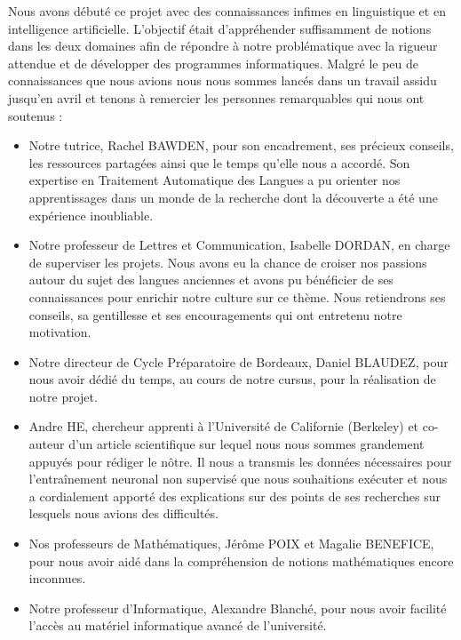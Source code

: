 \documentclass[12pt, twoside]{report}
\begin{document}
Nous avons débuté ce projet avec des connaissances infimes en linguistique et en intelligence artificielle. L’objectif était d’appréhender suffisamment de notions dans les deux domaines afin de répondre à notre problématique avec la rigueur attendue et de développer des programmes informatiques. Malgré le peu de connaissances que nous avions nous nous sommes lancés dans un travail assidu jusqu'en avril et tenons à remercier les personnes remarquables qui nous ont soutenus :
\begin{itemize}
    \item Notre tutrice, Rachel BAWDEN, pour son encadrement, ses précieux conseils, les ressources partagées ainsi que le temps qu’elle nous a accordé. Son expertise en Traitement Automatique des Langues a pu orienter nos apprentissages dans un monde de la recherche dont la découverte a été une expérience inoubliable.\\
    \item Notre professeur de Lettres et Communication, Isabelle DORDAN, en charge de superviser les projets. Nous avons eu la chance de croiser nos passions autour du sujet des langues anciennes et avons pu bénéficier de ses connaissances pour enrichir notre culture sur ce thème. Nous retiendrons ses conseils, sa gentillesse et ses encouragements qui ont entretenu notre motivation.\\
    \item Notre directeur de Cycle Préparatoire de Bordeaux, Daniel BLAUDEZ, pour nous avoir dédié du temps, au cours de notre cursus, pour la réalisation de notre projet.\\
    \item Andre HE, chercheur apprenti à l’Université de Californie (Berkeley) et co-auteur d’un article scientifique sur lequel nous nous sommes grandement appuyés pour rédiger le nôtre. Il nous a transmis les données nécessaires pour l’entraînement neuronal non supervisé que nous souhaitions exécuter et nous a cordialement apporté des explications sur des points de ses recherches sur lesquels nous avions des difficultés.\\
    \item Nos professeurs de Mathématiques, Jérôme POIX et Magalie BENEFICE, pour nous avoir aidé dans la compréhension de notions mathématiques encore inconnues.\\
    \item Notre professeur d’Informatique, Alexandre Blanché, pour nous avoir facilité l’accès au matériel informatique avancé de l’université.\\
\end{itemize}
\end{document}
